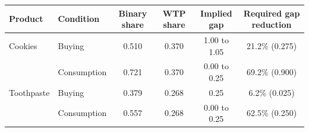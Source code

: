 \begin{tabular}{llcccc}
\toprule
Product & Condition & Binary share & WTP share & Implied gap & Required gap reduction \\
\midrule
Cookies & Buying & 0.510 & 0.370 & 1.00 to 1.05 & 21.2\% (0.275) \\
 & Consumption & 0.721 & 0.370 & 0.00 to 0.25 & 69.2\% (0.900) \\
\midrule
Toothpaste & Buying & 0.379 & 0.268 & 0.25 & 6.2\% (0.025) \\
 & Consumption & 0.557 & 0.268 & 0.00 to 0.25 & 62.5\% (0.250) \\
\bottomrule
\end{tabular}
